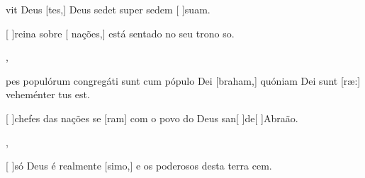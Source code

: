 {  {\item {}vit Deus [tes,] Deus sedet super sedem [ ]{su}am.}%
    {\item {}[ ]{rei}na sobre [ nações,] está sentado no seu trono so.},
  {\item {}pes populórum congregáti sunt cum pópulo Dei [braham,] quóniam Dei sunt [\-ræ:] veheménter tus est.}%
    {\item {}[ ]{che}fes das nações se [ram] com o povo do Deus san[ ]{de}[ ]{A}braão.},
  {}%
    {\item {}[ ]{só} Deus é realmente [simo,] e os poderosos desta terra cem.}
}